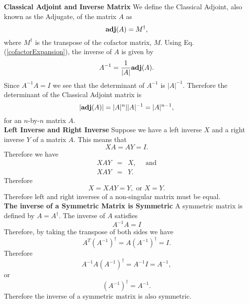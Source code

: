 {\bf Classical Adjoint and Inverse Matrix}
We define the Classical Adjoint, also known as the Adjugate, of the matrix $A$ as
\[ {\bf adj}(A)= M^\dagger, \] where $M^\dagger$ is the transpose of the cofactor matrix, $M$.
Using Eq.(\ref{cofactorExpansion}), the inverse of $A$ is given by
\[ A^{-1} = {1\over|A|}{\bf adj}(A).\label{inverseMatrix}\] Since $A^{-1} A = I$ we see that the determinant of $A^{-1}$ is $|A|^{-1}$. 
Therefore the determinant of the Classical Adjoint matrix is \[ |{\bf adj}(A)| = |A|^n | |A|^{-1} = |A|^{n-1},\] for an $n$-by-$n$ matrix $A$. \\

{\bf Left Inverse and Right Inverse}
Suppose we have a left inverse $X$ and a right inverse $Y$ of a matrix $A$. This means that 
\[ XA = AY = I.\] Therefore we have 
\begin{eqnarray*}
XAY &=& X, \quad\mbox{ and}\\
XAY &=& Y.
\end{eqnarray*}Therefore 
\[X = XAY = Y, \mbox{ or }  X=Y.\]  Therefore left and right inverses of a non-singular matrix must be equal.\\

{\bf The inverse of a Symmetric Matrix is Symmetric}
A symmetric matrix is defined by $A = A^\dagger$. The inverse of $A$ satisfies
\[ A^{-1} A = I \] Therefore, by taking the transpose of both sides we have
\[ A^T (A^{-1})^\dagger = A (A^{-1})^\dagger = I.\]Therefore 
\[ A^{-1} A (A^{-1})^\dagger = A^{-1} I = A^{-1},\] or 
\[(A^{-1})^\dagger = A^{-1}.\]Therefore the inverse of a symmetric matrix is also symmetric. \\


